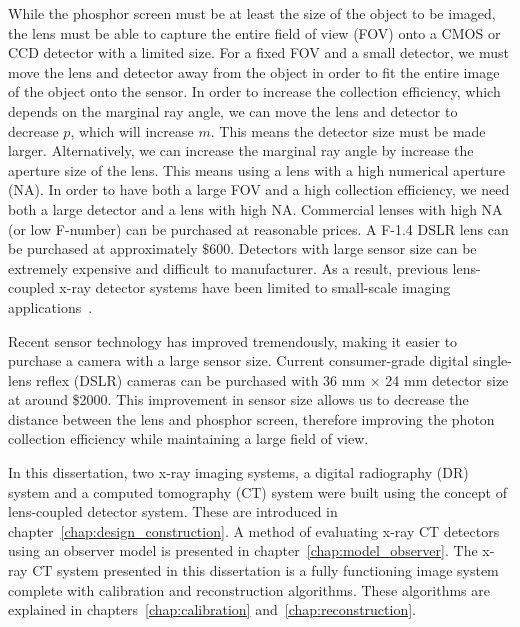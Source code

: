 While the phosphor screen must be at least the size of the object to be imaged, the lens must be able to capture the entire field of view (FOV) onto a CMOS or CCD detector with a limited size.  For a fixed FOV and a small detector, we must move the lens and detector away from the object in order to fit the entire image of the object onto the sensor.  In order to increase the collection efficiency, which depends on the marginal ray angle, we can move the lens and detector to decrease $p$, which will increase $m$.  This means the detector size must be made larger.  Alternatively, we can increase the marginal ray angle by increase the aperture size of the lens.  This means using a lens with a high numerical aperture (NA).  In order to have both a large FOV and a high collection efficiency, we need both a large detector and a lens with high NA.  Commercial lenses with high NA (or low F-number) can be purchased at reasonable prices.  A F-1.4 DSLR lens can be purchased at approximately $\$600$.  Detectors with large sensor size can be extremely expensive and difficult to manufacturer.  As a result, previous lens-coupled x-ray detector systems have been limited to small-scale imaging applications~\citep{lee2001, kim2005, tate2005, madden2006}.  

Recent sensor technology has improved tremendously, making it easier to purchase a camera with a large sensor size.  Current consumer-grade digital single-lens reflex (DSLR) cameras can be purchased with 36 mm $\times$ 24 mm detector size at around \$2000.  This improvement in sensor size allows us to decrease the distance between the lens and phosphor screen, therefore improving the photon collection efficiency while maintaining a large field of view.

In this dissertation, two x-ray imaging systems, a digital radiography (DR) system and a computed tomography (CT) system were built using the concept of lens-coupled detector system.  These are introduced in chapter~\ref{chap:design_construction}.  A method of evaluating x-ray CT detectors using an observer model is presented in chapter~\ref{chap:model_observer}.   The x-ray CT system presented in this dissertation is a fully functioning image system complete with calibration and reconstruction algorithms.  These algorithms are explained in chapters~\ref{chap:calibration} and~\ref{chap:reconstruction}.







































